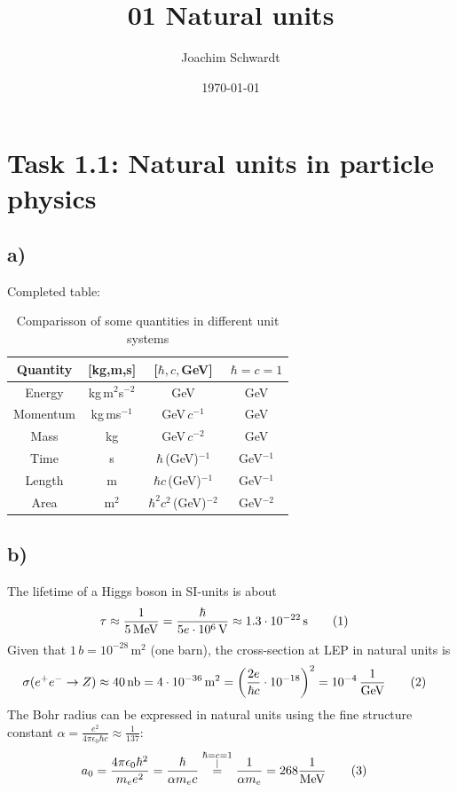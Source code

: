 \documentclass[a4paper,12pt]{article}
\newcommand\numberthis{\addtocounter{equation}{1}\tag{\theequation}}
\newcommand{\kom}{}
\newcommand{\kla}{}
\newcommand{\tecxt}{}
\begin{document}
\title{01 Natural units}
\author{Joachim Schwardt}
\date{\today}
\maketitle

\section*{Task 1.1: Natural units in particle physics}
\subsection*{a)}
Completed table:
\begin{table}[h!]
\centering
\begin{tabular}{c|c|c|c}
Quantity&[kg,m,s]&[$\hbar,c,$GeV]&$\hbar=c=1$ \\ \hline
Energy&kg\,m${}^2$s${}^{-2}$&GeV&GeV \\ \hline
Momentum&kg\,ms${}^{-1}$&GeV\,$c^{-1}$&GeV \\ \hline
Mass&kg&GeV\,$c^{-2}$&GeV \\ \hline
Time&s&$\hbar$\,(GeV)${}^{-1}$&GeV${}^{-1}$ \\ \hline
Length&m&$\hbar c$\,(GeV)${}^{-1}$&GeV${}^{-1}$ \\ \hline
Area&m${}^2$&$\hbar^2 c^2$\,(GeV)${}^{-2}$&GeV${}^{-2}$
\end{tabular}
\caption{Comparisson of some quantities in different unit systems}
\label{Comparisson of some quantities in different unit systems}
\end{table}
\subsection*{b)}
The lifetime of a Higgs boson in SI-units is about
\begin{align*}
\tau &\approx\frac{1}{5\,\tecxt\text{MeV}}=\frac{\hbar}{5e\cdot 10^6\,\tecxt\text{V}}\approx 1.3\cdot 10^{-22}\,\tecxt\text{s}\numberthis\label{Lifetime of a higgs boson}
\end{align*}
Given that $1\,b=10^{-28}\,\tecxt\text{m}^2$ (one barn), the cross-section at LEP in natural units is
\begin{align*}
\sigma(e^+e^-\rightarrow Z) &\approx 40\,\tecxt\text{nb}=4\cdot 10^{-36}\,\tecxt\text{m}^2=\kla\left( {\frac{2e}{\hbar c}\cdot 10^{-18}} \right)^2=10^{-4}\,\frac{1}{\tecxt\text{GeV}}\numberthis\label{Cross section at LEP}
\end{align*}
The Bohr radius can be expressed in natural units using the fine structure constant $\alpha=\frac{e^2}{4\pi\epsilon_0\hbar c}\approx\frac{1}{137}$:
\begin{align*}
a_0&=\frac{4\pi\epsilon_0\hbar^2}{m_ee^2}=\frac{\hbar}{\alpha m_ec}\kom\overset{\substack{{\hbar=c=1} \\ |}}{=}\frac{1}{\alpha m_e}=268\frac{1}{\tecxt\text{MeV}}\numberthis\label{Bohr radius in natural units}
\end{align*}
\end{document}
